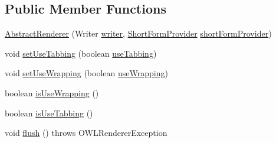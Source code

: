 \subsection*{Public Member Functions}
\begin{DoxyCompactItemize}
\item 
\hyperlink{classuk_1_1ac_1_1manchester_1_1cs_1_1owl_1_1owlapi_1_1mansyntaxrenderer_1_1_abstract_renderer_adf0a0f5d219ef564b8d16a2ca266538d}{Abstract\-Renderer} (Writer \hyperlink{classuk_1_1ac_1_1manchester_1_1cs_1_1owl_1_1owlapi_1_1mansyntaxrenderer_1_1_abstract_renderer_aa1198fed3e789d2e588e8c5708ecd539}{writer}, \hyperlink{interfaceorg_1_1semanticweb_1_1owlapi_1_1util_1_1_short_form_provider}{Short\-Form\-Provider} \hyperlink{classuk_1_1ac_1_1manchester_1_1cs_1_1owl_1_1owlapi_1_1mansyntaxrenderer_1_1_abstract_renderer_af6154992d5c8bf7b61b409363d9459b5}{short\-Form\-Provider})
\item 
void \hyperlink{classuk_1_1ac_1_1manchester_1_1cs_1_1owl_1_1owlapi_1_1mansyntaxrenderer_1_1_abstract_renderer_ab13141e990fa56482980ab2f06ab2bd4}{set\-Use\-Tabbing} (boolean \hyperlink{classuk_1_1ac_1_1manchester_1_1cs_1_1owl_1_1owlapi_1_1mansyntaxrenderer_1_1_abstract_renderer_a5b2a349c7ccc09bb3ee53e80952275de}{use\-Tabbing})
\item 
void \hyperlink{classuk_1_1ac_1_1manchester_1_1cs_1_1owl_1_1owlapi_1_1mansyntaxrenderer_1_1_abstract_renderer_a6590756ec2eb40adfc5b43a908d68a7b}{set\-Use\-Wrapping} (boolean \hyperlink{classuk_1_1ac_1_1manchester_1_1cs_1_1owl_1_1owlapi_1_1mansyntaxrenderer_1_1_abstract_renderer_a94b91733f23aa843bd3f93e1bf385b3f}{use\-Wrapping})
\item 
boolean \hyperlink{classuk_1_1ac_1_1manchester_1_1cs_1_1owl_1_1owlapi_1_1mansyntaxrenderer_1_1_abstract_renderer_a38ceef1012bc233d41bd9923ec64edfc}{is\-Use\-Wrapping} ()
\item 
boolean \hyperlink{classuk_1_1ac_1_1manchester_1_1cs_1_1owl_1_1owlapi_1_1mansyntaxrenderer_1_1_abstract_renderer_a86480757f9777fbc1a663f9504ba9bbe}{is\-Use\-Tabbing} ()
\item 
void \hyperlink{classuk_1_1ac_1_1manchester_1_1cs_1_1owl_1_1owlapi_1_1mansyntaxrenderer_1_1_abstract_renderer_a8c0d756c2921b500713ff9de6f9aed18}{flush} ()  throws O\-W\-L\-Renderer\-Exception 
\end{DoxyCompactItemize}
